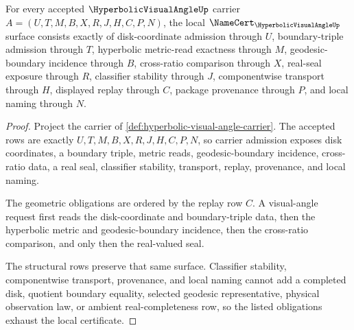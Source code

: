 \begin{theorem}
\label{thm:hyperbolic-visual-angle-namecert-obligations}
For every accepted $\HyperbolicVisualAngleUp$ carrier $A=(U,T,M,B,X,R,J,H,C,P,N)$, the local $\NameCert_{\HyperbolicVisualAngleUp}$ surface consists exactly of disk-coordinate admission through $U$, boundary-triple admission through $T$, hyperbolic metric-read exactness through $M$, geodesic-boundary incidence through $B$, cross-ratio comparison through $X$, real-seal exposure through $R$, classifier stability through $J$, componentwise transport through $H$, displayed replay through $C$, package provenance through $P$, and local naming through $N$.
\end{theorem}
\begin{proof}
Project the carrier of \autoref{def:hyperbolic-visual-angle-carrier}. The accepted rows are exactly $U,T,M,B,X,R,J,H,C,P,N$, so carrier admission exposes disk coordinates, a boundary triple, metric reads, geodesic-boundary incidence, cross-ratio data, a real seal, classifier stability, transport, replay, provenance, and local naming.

The geometric obligations are ordered by the replay row $C$. A visual-angle request first reads the disk-coordinate and boundary-triple data, then the hyperbolic metric and geodesic-boundary incidence, then the cross-ratio comparison, and only then the real-valued seal.

The structural rows preserve that same surface. Classifier stability, componentwise transport, provenance, and local naming cannot add a completed disk, quotient boundary equality, selected geodesic representative, physical observation law, or ambient real-completeness row, so the listed obligations exhaust the local certificate.
\end{proof}

